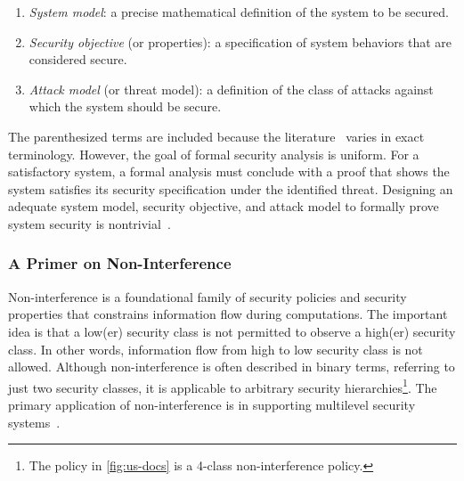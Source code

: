 \begin{enumerate}

\item \emph{System model}: a precise mathematical definition of the system to be secured.

\item \emph{Security objective} (or properties): 
a specification of system behaviors that are considered secure.

\item \emph{Attack model} (or threat model): 
a definition of the class of attacks against which the system should be secure.

\end{enumerate}
The parenthesized terms are included because the literature~\cite{bognar2022, bau2011} varies in exact terminology.
However, the goal of formal security analysis is uniform.
For a satisfactory system, a formal analysis must conclude with a proof that shows the system satisfies its security specification under the identified threat.
Designing an adequate system model, 
security objective, 
and attack model to formally prove system security is nontrivial~\cite{piessens2024}.

\subsubsection{A Primer on Non-Interference}
\label{subsec:ni}

Non-interference
is a foundational family of security policies and security properties
 that constrains information flow during computations.
The important idea is that a low(er) security class is not permitted to observe a high(er) security class.
In other words, information flow from high to low security class is not allowed.
Although non-interference
 is often described in binary terms, referring to just two security classes, it is applicable to arbitrary security hierarchies\footnote{The policy in \autoref{fig:us-docs} is a 4-class non-interference policy.}.
The primary application of non-interference 
is in supporting multilevel security systems~\cite{roscoe1999}.

